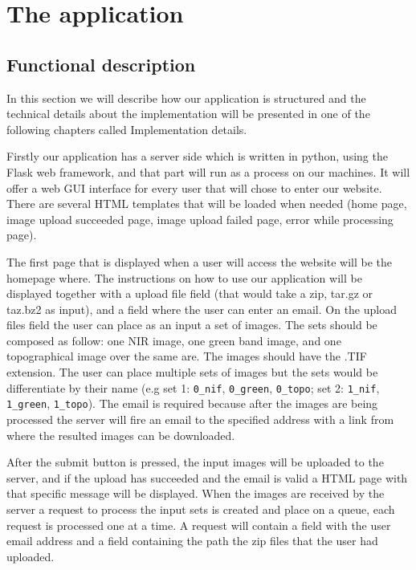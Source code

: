\documentclass[12pt, a4paper]{report}
\begin{document}
\newpage
\chapter{The application}

\section{Functional description}

\quad 
In this section we will describe how our application is structured and the technical details about the implementation will be presented in one of the following chapters called Implementation details. 
\par 

Firstly our application has a server side which is written in python, using the Flask web framework, and that part will run as a process on our machines. It will offer a web GUI interface for every user that will chose to enter our website. There are several HTML templates that will be loaded when needed (home page, image upload succeeded page, image upload failed page, error while processing page). 
\par 

The first page that is displayed when a user will access the website will be the homepage where. The instructions on how to use our application will be displayed together with a upload file field (that would take a zip, tar.gz or taz.bz2 as input), and a field where the user can enter an email. On the upload files field the user can place as an input a set of images. The sets should be composed as follow: one NIR image, one green band image, and one topographical image over the same are. The images should have the .TIF extension. The user can place multiple sets of images but the sets would be differentiate by their name (e.g set 1: \texttt{0\_nif}, \texttt{0\_green}, \texttt{0\_topo}; set 2: \texttt{1\_nif}, \texttt{1\_green}, \texttt{1\_topo}). The email is required because after the images are being processed the server will fire an email to the specified address with a link from where the resulted images can be downloaded.
\par 

After the submit button is pressed, the input images will be uploaded to the server, and if the upload has succeeded and the email is valid a HTML page with that specific message will be displayed. When the images are received by the server a request to process the input sets is created and place on a queue, each request is processed one at a time. A request will contain a field with the user email address and a field containing the path the zip files that the user had uploaded.
\par 
\end{document}
